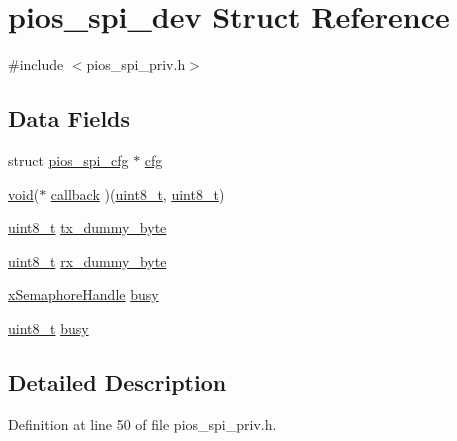 \hypertarget{structpios__spi__dev}{\section{pios\-\_\-spi\-\_\-dev Struct Reference}
\label{structpios__spi__dev}
}


{\ttfamily \#include $<$pios\-\_\-spi\-\_\-priv.\-h$>$}

\subsection*{Data Fields}
\begin{DoxyCompactItemize}
\item 
struct \hyperlink{structpios__spi__cfg}{pios\-\_\-spi\-\_\-cfg} $\ast$ \hyperlink{structpios__spi__dev_afcd7e74a6f561b546a7b828466a12f94}{cfg}
\item 
\hyperlink{group___n_a_m_e_ga18028b8badbf1ea7e704ccac3c488e82}{void}($\ast$ \hyperlink{structpios__spi__dev_a15f1ecafedc8c12d37bf9bf066b993c6}{callback} )(\hyperlink{stdint_8h_aba7bc1797add20fe3efdf37ced1182c5}{uint8\-\_\-t}, \hyperlink{stdint_8h_aba7bc1797add20fe3efdf37ced1182c5}{uint8\-\_\-t})
\item 
\hyperlink{stdint_8h_aba7bc1797add20fe3efdf37ced1182c5}{uint8\-\_\-t} \hyperlink{structpios__spi__dev_a72b66190a7211a66c58fdc359c742438}{tx\-\_\-dummy\-\_\-byte}
\item 
\hyperlink{stdint_8h_aba7bc1797add20fe3efdf37ced1182c5}{uint8\-\_\-t} \hyperlink{structpios__spi__dev_a003d648a4e5f69fab071c4ed53059418}{rx\-\_\-dummy\-\_\-byte}
\item 
\hyperlink{_common_2_libraries_2_free_r_t_o_s_2_source_2include_2semphr_8h_aa91aa1b6835a184838f9ccf138a6ad10}{x\-Semaphore\-Handle} \hyperlink{structpios__spi__dev_a3fcabfcfba2df1b74edfeacd5b0f4a5e}{busy}
\item 
\hyperlink{stdint_8h_aba7bc1797add20fe3efdf37ced1182c5}{uint8\-\_\-t} \hyperlink{structpios__spi__dev_a90778ce216b2c078f3c6dade52f3f2be}{busy}
\end{DoxyCompactItemize}


\subsection{Detailed Description}


Definition at line 50 of file pios\-\_\-spi\-\_\-priv.\-h.



